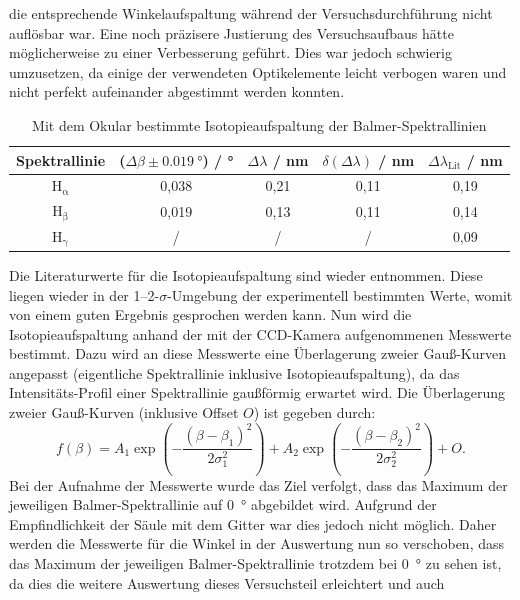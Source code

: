 die entsprechende Winkelaufspaltung während der Versuchsdurchführung nicht auflösbar war. Eine noch präzisere Justierung des Versuchsaufbaus hätte möglicherweise
zu einer Verbesserung geführt. Dies war jedoch schwierig umzusetzen, da einige der verwendeten Optikelemente leicht verbogen waren und nicht perfekt aufeinander
abgestimmt werden konnten.
\begin{table}[H]
    \centering
    \caption{Mit dem Okular bestimmte Isotopieaufspaltung der Balmer-Spektrallinien}
    \begin{tabular}{c|c|c|c|c}
        Spektrallinie & ($\Delta \beta \pm \SI{0,019}{\degree}$) / \unit{\degree} & $\Delta \lambda$ / \unit{\nano \meter} & $\delta (\Delta \lambda)$ / \unit{\nano \meter} & $\Delta \lambda_{\mathrm{Lit}}$ / \unit{\nano \meter} \\
        \hline
        $\mathrm{H_{\alpha}}$ & 0,038 & 0,21 & 0,11 & 0,19 \\
        $\mathrm{H_{\beta}}$ & 0,019 & 0,13 & 0,11 & 0,14 \\
        $\mathrm{H_{\gamma}}$ & / & / & / & 0,09
    \end{tabular}\label{tab:aufspaltung_balmer}
\end{table} Die Literaturwerte für die Isotopieaufspaltung sind wieder \cite{balmer_handblatt} entnommen. Diese liegen wieder in der 1--2-$\sigma$-Umgebung der
experimentell bestimmten Werte, womit von einem guten Ergebnis gesprochen werden kann.\newline
\indent Nun wird die Isotopieaufspaltung anhand der mit der CCD-Kamera aufgenommenen Messwerte bestimmt. Dazu wird an diese Messwerte eine Überlagerung
zweier Gauß-Kurven angepasst (eigentliche Spektrallinie inklusive Isotopieaufspaltung), da das Intensitäts-Profil einer Spektrallinie gaußförmig erwartet wird.
Die Überlagerung zweier Gauß-Kurven (inklusive Offset $O$) ist gegeben durch:
\begin{equation*}
    f(\beta) = A_1 \exp(-\frac{(\beta - \beta_1)^2}{2 \sigma_1^2}) + A_2 \exp(-\frac{(\beta - \beta_2)^2}{2 \sigma_2^2}) + O .
\end{equation*} Bei der Aufnahme der Messwerte wurde das Ziel verfolgt, dass das Maximum der jeweiligen Balmer-Spektrallinie auf \SI{0}{\degree} abgebildet wird.
Aufgrund der Empfindlichkeit der Säule mit dem Gitter war dies jedoch nicht möglich. Daher werden die Messwerte für die Winkel in der Auswertung nun so verschoben, dass
das Maximum der jeweiligen Balmer-Spektrallinie trotzdem bei \SI{0}{\degree} zu sehen ist, da dies die weitere Auswertung dieses Versuchsteil erleichtert und auch
